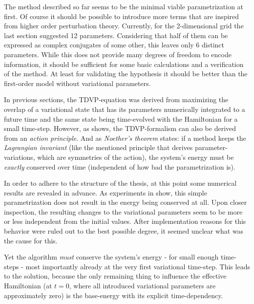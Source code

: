 The method described so far seems to be the minimal viable parametrization at first.
Of course it should be possible to introduce more terms that are inspired from higher order perturbation theory.
Currently, for the 2-dimensional grid the last section suggested 12 parameters. 
Considering that half of them can be expressed as complex conjugates of some other, this leaves only 6 distinct parameters.
While this does not provide many degrees of freedom to encode information, it should be sufficient for some basic calculations and a verification of the method.
At least for validating the hypothesis it should be better than the first-order model without variational parameters.

In previous sections, the TDVP-equation was derived from maximizing the overlap of a variational state that has its parameters numerically integrated to a future time and the same state being time-evolved with the Hamiltonian for a small time-step.
However, as \cite{TDVPcomplexPrefactors} shows, the TDVP-formalism can also be derived from an \emph{action principle}.
And as \emph{Noether's theorem} states: if a method keeps the \emph{Lagrangian invariant} (like the mentioned principle that derives parameter-variations, which are symmetries of the action), the system's energy must be \emph{exactly} conserved over time \cite{energyConservationFromActionPrinciple} (independent of how \glqq bad\grqq{} the parametrization is).

In order to adhere to the structure of the thesis, at this point some numerical results are revealed in advance. 
As experiments in  show, this simple parametrization does not result in the energy being conserved at all.
Upon closer inspection, the resulting changes to the variational parameters seem to be more or less independent from the initial values.
After implementation reasons for this behavior were ruled out to the best possible degree, it seemed unclear what was the cause for this.

Yet the algorithm \emph{must} conserve the system's energy - for small enough time-steps - most importantly already at the very first variational time-step.
This leads to the solution, because the only remaining thing to influence the effective Hamiltonian (at $t=0$, where all introduced variational parameters are approximately zero) is the base-energy with its explicit time-dependency.

